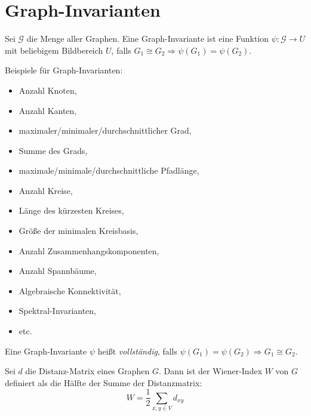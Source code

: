\chapter{Graph-Invarianten}

\begin{definition}
    Sei $ \mathcal{G} $ die Menge aller Graphen.
    Eine Graph-Invariante ist eine Funktion $ \psi: \mathcal G \rightarrow U $ mit beliebigem Bildbereich $ U $, falls $ G_1 \cong G_2 \Rightarrow \psi(G_1) = \psi(G_2) $.
\end{definition}

\begin{example}
    Beispiele für Graph-Invarianten:
    \begin{itemize}
        \item Anzahl Knoten,
        \item Anzahl Kanten,
        \item maximaler/minimaler/durchschnittlicher Grad,
        \item Summe des Grads,
        \item maximale/minimale/durchschnittliche Pfadlänge,
        \item Anzahl Kreise,
        \item Länge des kürzesten Kreises,
        \item Größe der minimalen Kreisbasis,
        \item Anzahl Zusammenhangskomponenten,
        \item Anzahl Spannbäume,
        \item Algebraische Konnektivität,
        \item Spektral-Invarianten,
        \item etc.
    \end{itemize}
\end{example}

\begin{definition}[Vollständig]
    Eine Graph-Invariante $ \psi $ heißt \textit{vollständig}, falls $ \psi(G_1) = \psi(G_2) \Rightarrow G_1 \cong G_2 $.
\end{definition}

\begin{definition}
    Sei $ d $ die Distanz-Matrix eines Graphen $ G $.
    Dann ist der Wiener-Index $ W $ von $ G $ definiert als die Hälfte der Summe der Distanzmatrix:
    \begin{equation*}
        W = \frac{1}{2} \sum_{x, y \in V} d_{xy}
    \end{equation*}
\end{definition}

